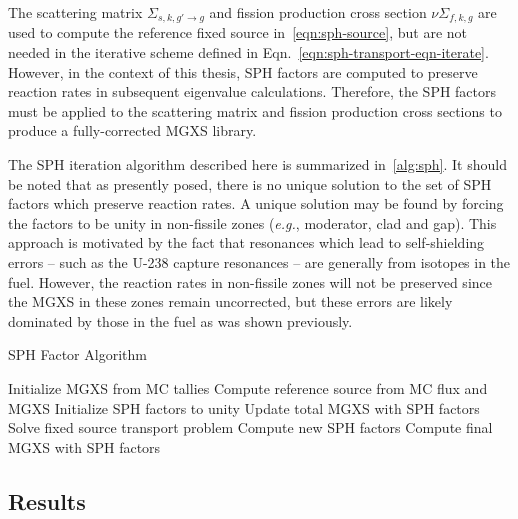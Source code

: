 The scattering matrix $\Sigma_{s,k,g'\rightarrow g}$ and fission production cross section $\nu\Sigma_{f,k,g}$ are used to compute the reference fixed source in~\autoref{eqn:sph-source}, but are not needed in the iterative scheme defined in Eqn.~\ref{eqn:sph-transport-eqn-iterate}. However, in the context of this thesis, SPH factors are computed to preserve reaction rates in subsequent eigenvalue calculations. Therefore, the SPH factors must be applied to the scattering matrix and fission production cross sections to produce a fully-corrected MGXS library.

The SPH iteration algorithm described here is summarized in~\autoref{alg:sph}. It should be noted that as presently posed, there is no unique solution to the set of SPH factors which preserve reaction rates. A unique solution may be found by forcing the factors to be unity in non-fissile zones (\textit{e.g.}, moderator, clad and gap). This approach is motivated by the fact that resonances which lead to self-shielding errors -- such as the U-238 capture resonances -- are generally from isotopes in the fuel. However, the reaction rates in non-fissile zones will not be preserved since the MGXS in these zones remain uncorrected, but these errors are likely dominated by those in the fuel as was shown previously.

\begin{algorithm}[h]
\caption{SPH Factor Algorithm}
\label{alg:sph}
\begin{algorithmic}[1]
  \State Initialize MGXS from MC tallies
  \State Compute reference source from MC flux and MGXS
  \State Initialize SPH factors to unity
    \State Update total MGXS with SPH factors
    \State Solve fixed source transport problem\footnotemark
    \State Compute new SPH factors
  \EndWhile
  \State Compute final MGXS with SPH factors
\end{algorithmic}
\end{algorithm}



\subsection{Results}
\label{sec:sph-results}

